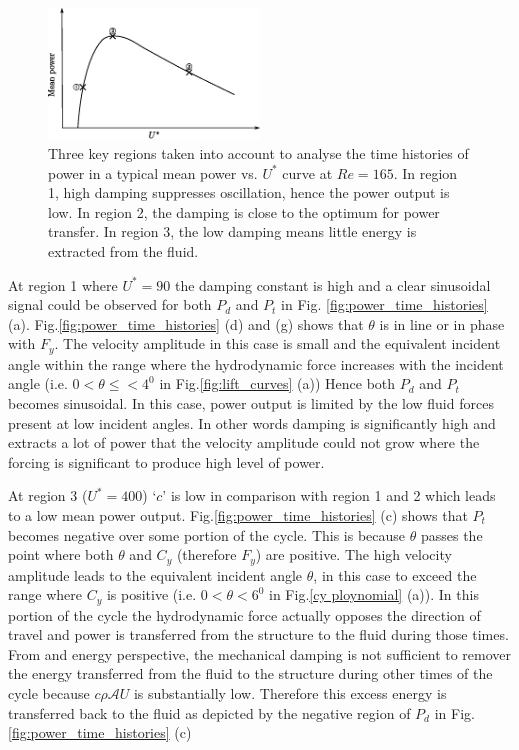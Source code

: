 \begin{figure}[h!]
\centering
\includegraphics[width=0.5\textwidth]{../FnP/sketch_1}
\caption{ Three key regions taken into account to analyse the time histories of power in a typical mean power vs. $U^*$ curve at $Re=165$. In region 1, high damping suppresses oscillation, hence the power output is low. In region 2, the damping is close to the optimum for power transfer. In region 3, the low damping means little energy is extracted from the fluid.}
\label{fig:regions_1}
\end{figure}

 
 
 
 At region 1 where $U^*=90$ the damping constant is high and a clear sinusoidal signal could be observed for both $P_d$ and $P_t$ in Fig. \ref{fig:power_time_histories} (a). Fig.\ref{fig:power_time_histories} (d) and (g) shows that $\theta$ is in line or in phase with $F_y$.  The velocity amplitude in this case is small and the equivalent incident angle within the range where the hydrodynamic force increases with the incident angle (i.e. $0<\theta \leq < 4^0$ in Fig.\ref{fig:lift_curves} (a)) Hence both $P_d$ and $P_t$ becomes sinusoidal. In this case, power output is limited by the low fluid forces present at low incident angles. In other words damping is significantly high and extracts a lot of power that the velocity amplitude could not grow where the forcing  is significant to produce high level of power.   
 
 
  At region 3 ($U^*= 400$) `$c$' is low in comparison with region 1 and 2 which leads to a low mean power output. Fig.\ref{fig:power_time_histories} (c) shows that $P_t$ becomes negative over some portion of the cycle. This is because $\theta$  passes the point where both $\theta$ and $C_y$ (therefore $F_y$) are positive. The high velocity amplitude leads to the equivalent incident angle $\theta$, in this case to exceed the range where $C_y$ is positive (i.e. $0<\theta<6^0$ in Fig.\ref{cy ploynomial} (a)). In this portion of the cycle the hydrodynamic force actually opposes the direction of travel and power is transferred from the structure to the fluid during those times. From and energy perspective, the mechanical damping is not sufficient to remover the energy transferred from the fluid to the structure during other times of the cycle because $c\rho\mathcal{A}U$ is substantially low. Therefore this excess energy is transferred back to the fluid as depicted by the negative region of $P_d$ in Fig.\ref{fig:power_time_histories} (c) 
 

